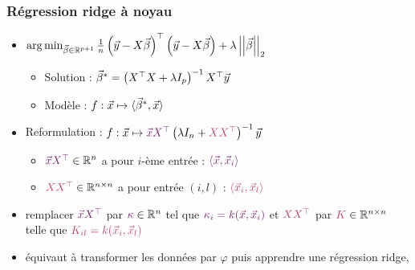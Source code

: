 \begin{frame}
  \frametitle{Régression ridge à noyau}
  \begin{itemize}
  \item {}
    {\footnotesize $\operatorname*{arg\,min}_{\vec{\beta} \in {\mathbb R}^{p+1}} \frac1n \left(\vec{y} - X \vec{\beta} \right)^\top
      \left(\vec{y} - X \vec{\beta} \right) + \lambda \left|\left|\vec{\beta}\right|\right|_2 $}      
    \begin{itemize}
    \item Solution : $\vec{\beta}^* = \left(X^\top X + \lambda I_p \right)^{-1} X^\top \vec{y}$
    \item Modèle : $f: \vec{x} \mapsto \langle \vec{\beta}^*, \vec{x} \rangle$
    \end{itemize}
  \item Reformulation :
    $f: \xvec \mapsto \textcolor{Aubergine}{\xvec X^\top} \left( \lambda I_n +
      \textcolor{MyPink}{XX^\top} \right)^{-1} \yvec $
    \pause
    \begin{itemize}
    \item $\textcolor{Aubergine}{\xvec X^\top} \in \RR^n$ a pour $i$-ème entrée :
      $\textcolor{Aubergine}{\langle \xvec, \xvec_i \rangle}$    
    \item $\textcolor{MyPink}{X X^\top} \in \RR^{n \times n}$ a pour entrée $(i,l)$ :
      $\textcolor{MyPink}{\langle \xvec_i, \xvec_l \rangle}$
    \end{itemize}
    \pause
  \item {} remplacer $\textcolor{Aubergine}{\xvec X^\top}$ par
    $\textcolor{Aubergine}{\kappa} \in \RR^n$ tel que
    $\textcolor{Aubergine}{\kappa_i = k(\xvec, \xvec_i)}$ et $\textcolor{MyPink}{XX^\top}$ par
    $\textcolor{MyPink}{K} \in \RR^{n \times n}$ telle que $\textcolor{MyPink}{K_{il} = k(\xvec_i, \xvec_l)}$
  \item[] équivaut à transformer les données par $\varphi$ puis apprendre une régression ridge, 
  \end{itemize}
\end{frame}

